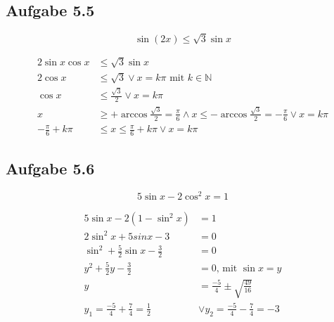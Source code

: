 \documentclass{standalone}
\begin{document}
\subsection{Aufgabe 5.5}
$$
\sin(2x) \leq \sqrt{3}\sin x
$$

\begin{align}
    2\sin x \cos x &\leq \sqrt{3} \sin x \\
    2\cos x &\leq \sqrt{3} \vee x = k\pi \text{ mit } k\in \mathbb{N}\\
    \cos x &\leq \frac{\sqrt{3}}{2} \vee x = k\pi \\
    x &\geq +\arccos \frac{\sqrt{3}}{2} = \frac{\pi}{6} \wedge x\leq -\arccos \frac{\sqrt{3}}{2} = -\frac{\pi}{6} \vee x = k\pi \\
    -\frac{\pi}{6}+k\pi &\leq x \leq \frac{\pi}{6}+k\pi \vee x = k\pi
\end{align}

\subsection{Aufgabe 5.6}
$$ 5 \sin x - 2\cos^2 x = 1 $$

\begin{align}
    5 \sin x - 2(1-\sin^2 x) &= 1\\
    2 \sin^2 x + 5 sin x - 3 &= 0\\
    \sin^2 + \frac{5}{2} \sin x - \frac{3}{2} &= 0\\
    y^2 + \frac{5}{2}y - \frac{3}{2} &= 0 \text{, mit } \sin x = y \\
    y &= \frac{-5}{4} \pm \sqrt{\frac{49}{16}} \\
    y_1 = \frac{-5}{4}+\frac{7}{4}=\frac{1}{2} &\vee y_2 = \frac{-5}{4} - \frac{7}{4} = -3
\end{align}
\end{document}
